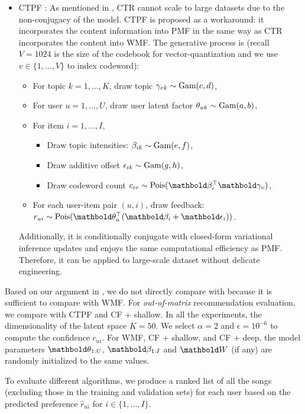 \begin{itemize}
\item \gls{CTPF} \citep{gopalan2014content}: As mentioned in , \gls{CTR} cannot scale to large datasets due to the non-conjugacy of the model. \gls{CTPF} is proposed as a workaround: it incorporates the content information into \gls{PMF} in the same way as \gls{CTR} incorporates the content into \gls{WMF}. 
The generative process is (recall $V = 1024$ is the size of the codebook for vector-quantization and we use $v \in \{1, \dots, V\}$ to index codeword):
\begin{itemize}
\item For topic $k = 1, \dots, K$, draw topic $\gamma_{vk} \sim \mathrm{Gam}(c, d)$,
\item For user $u = 1, \dots, U$, draw user latent factor $\theta_{uk} \sim \mathrm{Gam}(a, b)$,
\item For item $i = 1, \dots, I$,
\begin{itemize}
\item Draw topic intensities: $\beta_{ik} \sim \mathrm{Gam}(e, f)$,
\item Draw additive offset $\epsilon_{ik} \sim \mathrm{Gam}(g, h)$,
\item Draw codeword count $c_{iv} \sim \pois(\mb\beta_{i}^\top\mb\gamma_v)$,
\end{itemize}
\item For each user-item pair $(u, i)$, draw feedback: $r_{ui} \sim \pois(\mb\theta_u^\top (\mb\beta_i + \mb\epsilon_i) )$.
\end{itemize}
Additionally, it is conditionally conjugate with closed-form variational inference updates and enjoys the same computational efficiency as \gls{PMF}. Therefore, it can be applied to large-scale dataset without delicate engineering.
\end{itemize}

Based on our argument in , we do not directly compare with \citet{van2013deep} because it is sufficient to compare with \gls{WMF}. For \emph{out-of-matrix} recommendation evaluation, we compare with \gls{CTPF} and CF + shallow. In all the experiments, the dimensionality of the latent space $K = 50$. We select $\alpha = 2$ and $\epsilon = 10^{-6}$ to compute the confidence $c_{ui}$. For \gls{WMF}, CF + shallow, and CF + deep, the model parameters $\mb\theta_{1:U}$, $\mb\beta_{1:I}$ and $\mbW$ (if any) are randomly initialized to the same values. 

To evaluate different algorithms, we produce a ranked list of all the songs (excluding those in the training and validation sets) for each user based on the predicted preference $\hat{r}_{ui}$ for $i\in\{1, \dots, I\}$. 

